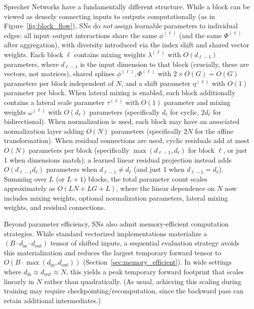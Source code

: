 \documentclass{article}
\theoremstyle{plain}
\theoremstyle{definition}
\theoremstyle{remark}
\begin{document}
Sprecher Networks have a fundamentally different structure. While a block can be viewed as densely connecting inputs to outputs computationally (as in Figure~\ref{fig:block_flow}), SNs do \emph{not} assign learnable parameters to individual edges: all input--output interactions share the same $\phi^{(\ell)}$ (and the same $\Phi^{(\ell)}$ after aggregation), with diversity introduced via the index shift and shared vector weights. Each block $\ell$ contains mixing weights $\lambda^{(\ell)}$ with $O(d_{\ell-1})$ parameters, where $d_{\ell-1}$ is the input dimension to that block (crucially, these are vectors, not matrices), shared splines $\phi^{(\ell)}, \Phi^{(\ell)}$ with $2 \times O(G) = O(G)$ parameters per block independent of $N$, and a shift parameter $\eta^{(\ell)}$ with $O(1)$ parameter per block. When lateral mixing is enabled, each block additionally contains a lateral scale parameter $\tau^{(\ell)}$ with $O(1)$ parameter and mixing weights $\omega^{(\ell)}$ with $O(d_\ell)$ parameters (specifically $d_\ell$ for cyclic, $2d_\ell$ for bidirectional). When normalization is used, each block may have an associated normalization layer adding $O(N)$ parameters (specifically $2N$ for the affine transformation). When residual connections are used, cyclic residuals add at most $O(N)$ parameters per block (specifically $\max(d_{\ell-1}, d_\ell)$ for block $\ell$, or just 1 when dimensions match); a learned linear residual projection instead adds $O(d_{\ell-1}d_\ell)$ parameters when $d_{\ell-1}\neq d_\ell$ (and just 1 when $d_{\ell-1}=d_\ell$). Summing over $L$ (or $L+1$) blocks, the total parameter count scales approximately as $O(LN + LG + L)$, where the linear dependence on $N$ now includes mixing weights, optional normalization parameters, lateral mixing weights, and residual connections.

Beyond parameter efficiency, SNs also admit memory-efficient computation strategies. While standard vectorized implementations materialize a $(B \cdot d_{\mathrm{in}} \cdot d_{\mathrm{out}})$ tensor of shifted inputs, a sequential evaluation strategy avoids this materialization and reduces the largest temporary forward tensor to $O(B \cdot \max(d_{\mathrm{in}}, d_{\mathrm{out}}))$ (Section~\ref{sec:memory_efficient}). In wide settings where $d_{\mathrm{in}}\approx d_{\mathrm{out}}\approx N$, this yields a peak temporary forward footprint that scales linearly in $N$ rather than quadratically. (As usual, achieving this scaling during training may require checkpointing/recomputation, since the backward pass can retain additional intermediates.)
\end{document}
